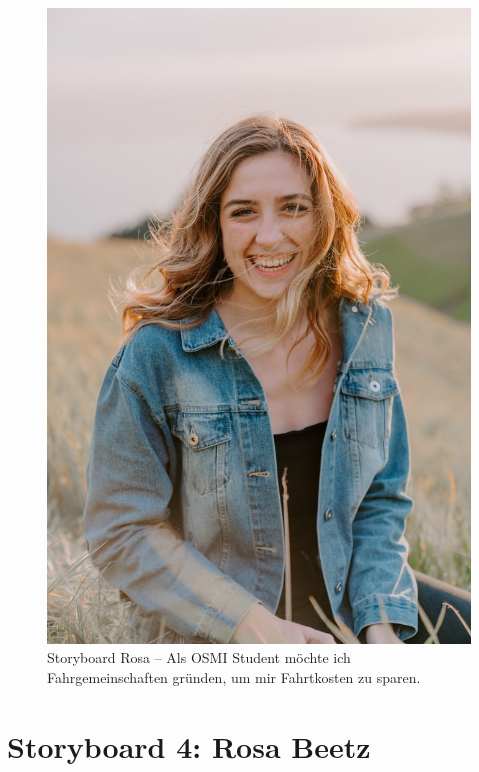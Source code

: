 \documentclass{article}
\begin{document}
\begin{figure}[h]
	\includegraphics[angle=90,width=\textwidth]{rosa}
	\centering
	\caption{Storyboard Rosa – Als OSMI Student möchte ich Fahrgemeinschaften gründen, um mir Fahrtkosten zu sparen.}
\end{figure}

\newpage

\section{Storyboard 4: Rosa Beetz}
\end{document}
